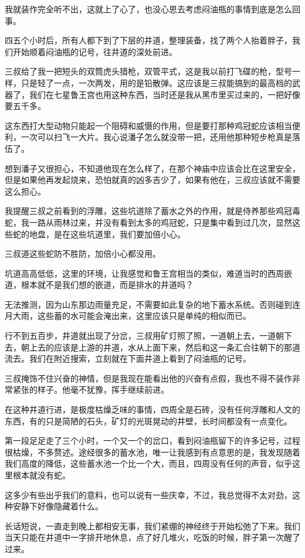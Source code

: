 我就装作完全听不出，这就上了心了，也没心思去考虑闷油瓶的事情到底是怎么回事。

四五个小时后，所有人都下到了下层的井道，整理装备，找了两个人抬着胖子，我们开始顺着闷油瓶的记号，往井道的深处前进。

三叔给了我一把短头的双筒虎头猎枪，双管平式，这是我以前打飞碟的枪，型号一样，只是轻了一点，一次两发，用的是铅散弹。这应该是三叔能搞到的最高档的武器了，我们在七星鲁王宫也用这种东西，当时还是我从黑市里买过来的，一把好像要五千多。

这东西打大型动物只能起一个阻碍和威慑的作用，但是要打那种鸡冠蛇应该相当便利，一次可以扫飞一大片。我心说潘子怎么就没带一把，还用他那种短步枪真是落伍了。

想到潘子又很担心，不知道他现在怎么样了，在那个神庙中应该会比在这里安全，但是如果他再发起烧来，恐怕就真的凶多吉少了，如果有他在，三叔应该就不需要这么担心。

我提醒三叔之前看到的浮雕，这些坑道除了蓄水之外的作用，就是侍养那些鸡冠毒蛇，我一路从雨林过来，并没有看到太多的鸡冠蛇，只是集中看到过几次，显然这些蛇的地盘，是在这些坑道里，我们要加倍小心。

三叔道这些蛇防不胜防，加倍小心都没用。

坑道高高低低，这里的环境，让我感觉和鲁王宫相当的类似，难道当时的西周嵌道，根本就不是我们想的嵌道，而是排水的井道吗？

无法推测，因为山东那边雨量充足，不需要如此复杂的地下蓄水系统。否则碰到连月大雨，这些蓄的水可能会淹出来，这里应该只是单纯的相似而已。

行不到五百步，井道就出现了分岔，三叔用矿灯照了照，一道朝上去，一道朝下去，朝上去的应该是上游的井道，水从上面下来，然后和这一条汇合往朝下的那道流去。我们在附近搜索，立刻就在下面井道上看到了闷油瓶的记号。

三叔掩饰不住兴奋的神情，但是我现在能看出他的兴奋有点假，我也不得不装作非常紧张的样子。他毫不犹豫，挥手继续前进。

在这种井道行进，是极度枯燥乏味的事情，四周全是石砖，没有任何浮雕和人文的东西，有的只是简陋的石头，矿灯的光斑晃动的井壁，长时间都没有一点变化。

第一段足足走了三个小时，一个又一个的岔口，看到闷油瓶留下的许多记号，过程很枯燥，不多赘述。途经很多的蓄水池，唯一让我感到有点意思的是，我发现随着我们高度的降低，这些蓄水池一个比一个大，而且，四周没有任何的声音，似乎这里根本就没有蛇。

这多少有些出乎我们的意料，也可以说有一些庆幸，不过，我总觉得不太对劲，这种安静下好像隐藏着什么。

长话短说，一直走到晚上都相安无事，我们紧绷的神经终于开始松弛了下来。我们当天只能在井道中一字排开地休息，点了好几堆火，吃饭的时候，胖子第一次醒了过来。

